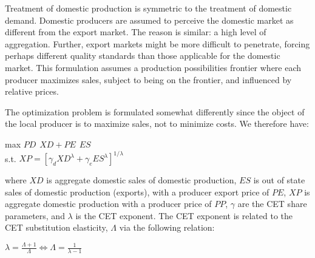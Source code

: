 \documentclass[12pt]{article}
\begin{document}
Treatment of domestic production is symmetric to the treatment of domestic demand. Domestic producers are assumed to perceive the domestic market as different from the export market. The reason is similar:  a high level of aggregation. Further, export markets might be more difficult to penetrate, forcing perhaps different quality standards than those applicable for the domestic market. This formulation assumes a production possibilities frontier where each producer maximizes sales, subject to being on the frontier, and influenced by relative prices.

The optimization problem is formulated somewhat differently since the object of the local producer is to maximize sales, not to minimize costs. We therefore have:

\begin {center}

max $PD \hspace{5pt} XD + PE \hspace{5pt} ES$\\
s.t. $XP = \left[\gamma_d XD^\lambda + \gamma_e ES^\lambda \right]^{1/\lambda}$

\end{center}

where $XD$ is aggregate domestic sales of domestic production, $ES$ is out of state sales of domestic production (exports), with a producer export price of $PE$, $XP$ is aggregate domestic production with a producer price of $PP$, $\gamma$ are the CET share parameters, and $\lambda$ is the CET exponent. The CET exponent is related to the CET substitution elasticity, $\Lambda$ via the following relation:

\begin{center}

$\lambda = \frac{\Lambda + 1}{\Lambda} \Longleftrightarrow \Lambda = \frac{1}{\lambda - 1}$

\end{center}
\end{document}

